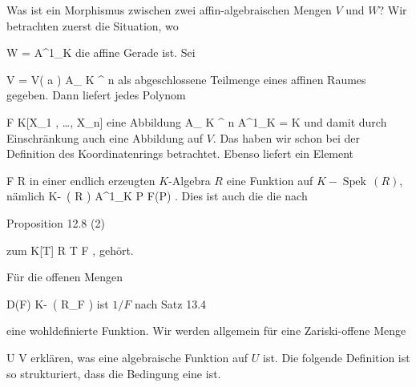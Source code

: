 \setcounter{section}{14}







Was ist ein Morphismus zwischen zwei affin-algebraischen Mengen $V$ und $W$? Wir betrachten zuerst die Situation, wo

\mavergleichskette
{\vergleichskette
{ W
}
{ = }{  {\mathbb A}^{1}_{K}
}
{  }{
}
{    }{
}
{   }{
}
}
{}{}{}
die affine Gerade ist. Sei

\mavergleichskette
{\vergleichskette
{ V
}
{ = }{ V(  {\mathfrak a} )
}
{ \subseteq }{ { {\mathbb A}_{ K }^{ n  } }
}
{    }{
}
{   }{
}
}
{}{}{}
als abgeschlossene Teilmenge eines affinen Raumes gegeben. Dann liefert jedes Polynom

\mavergleichskette
{\vergleichskette
{ F
}
{ \in }{  K[X_1  , \ldots ,  X_n]
}
{  }{
}
{    }{
}
{   }{
}
}
{}{}{}
eine Abbildung
 { { {\mathbb A}_{ K }^{ n  } } } { {\mathbb A}^{1}_{K}  = K
} {}
und damit durch Einschränkung auch eine Abbildung auf $V$. Das haben wir schon bei der Definition des Koordinatenrings betrachtet. Ebenso liefert ein Element

\mavergleichskette
{\vergleichskette
{ F
}
{ \in }{ R
}
{  }{
}
{    }{
}
{   }{
}
}
{}{}{}
in einer endlich erzeugten $K$-Algebra $R$ eine Funktion auf $K\!-\!\operatorname{Spek}\, \left(  R  \right)$, nämlich
\maabbeledisp {} { K\!-\!\, \left(  R  \right) } { {\mathbb A}^{1}_{K}
} { P } { F(P)
} {.}
Dies ist auch die
die nach

Proposition 12.8  (2)

zum
\maabbeledisp {} {K[T]  } { R
} {T} { F
} {,}
gehört.

Für die offenen Mengen

\mavergleichskette
{\vergleichskette
{  D(F)
}
{ \cong }{ K\!-\!\, \left(  R_F  \right)
}
{  }{
}
{    }{
}
{   }{
}
}
{}{}{}
ist $1/F$
nach
Satz 13.4

eine wohldefinierte Funktion. Wir werden allgemein für eine Zariski-offene Menge

\mavergleichskette
{\vergleichskette
{U
}
{ \subseteq }{V
}
{  }{
}
{    }{
}
{   }{
}
}
{}{}{}
erklären, was eine algebraische Funktion auf $U$ ist. Die folgende Definition ist so strukturiert, dass die Bedingung  eine  {} ist.


